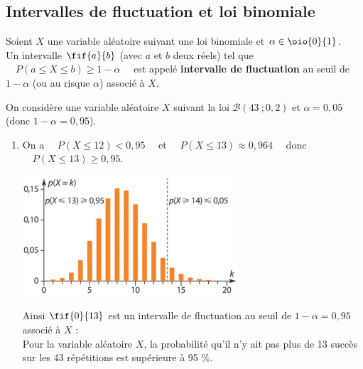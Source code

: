 \documentclass[a4paper,11pt,cours]{nsi} %
\begin{document}
\subsection*{Intervalles de fluctuation et loi binomiale}

\begin{definition}[]
    Soient $X$ une variable aléatoire suivant une loi binomiale et $\alpha\in\oio{0}{1}$.\\
    Un intervalle $\fif{a}{b}$ (avec $a$ et $b$ deux réels) tel que $\quad P(a\leqslant X\leqslant b)\geqslant 1-\alpha \quad$ est appelé \textbf{intervalle de fluctuation} au seuil de $1-\alpha$ (ou au risque $\alpha$) associé à $X$. 
\end{definition}

\begin{exemple}[s]
    On considère une variable aléatoire $X$ suivant la loi $\mathcal{B}(43\ ;0,2)$ et $\alpha=0,05$ (donc $1-\alpha=0,95$).
    \begin{enumerate}
        \item On a $\quad P(X\leqslant 12) <0,95\quad$ et $\quad P(X\leqslant 13)\approx 0,964\quad $ donc $\quad P(X\leqslant 13) \geqslant 0,95$.
        \begin{center}
            \includegraphics[width=8cm]{fluctuation1.jpg}
        \end{center}
        Ainsi $\fif{0}{13}$ est un intervalle de fluctuation au seuil de $1-\alpha=0,95$ associé à $X$ :\\[.5em]
        Pour la variable aléatoire $X$, la probabilité qu'il n'y ait pas plus de 13 succès sur les 43 répétitions est supérieure à 95 \%.
       

\end{enumerate}
\end{exemple}
\end{document}
